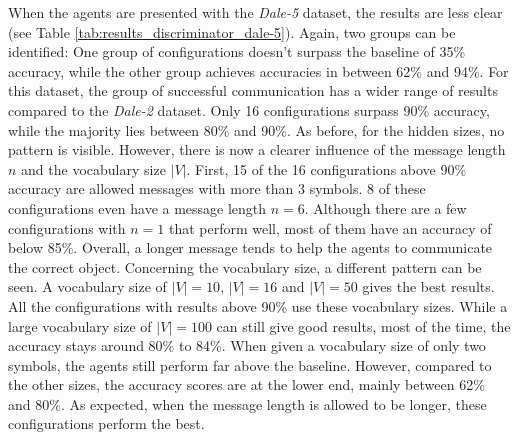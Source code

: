 When the agents are presented with the \emph{Dale-5} dataset, the results are less clear (see Table \ref{tab:results_discriminator_dale-5}).
Again, two groups can be identified: One group of configurations doesn't surpass the baseline of 35\% accuracy, while the other group achieves accuracies in between 62\% and 94\%.
For this dataset, the group of successful communication has a wider range of results compared to the \emph{Dale-2} dataset.
Only 16 configurations surpass 90\% accuracy, while the majority lies between 80\% and 90\%.
As before, for the hidden sizes, no pattern is visible.
However, there is now a clearer influence of the message length $n$ and the vocabulary size $|V|$.
First, 15 of the 16 configurations above 90\% accuracy are allowed messages with more than 3 symbols.
8 of these configurations even have a message length $n = 6$.
Although there are a few configurations with $n = 1$ that perform well, most of them have an accuracy of below 85\%.
Overall, a longer message tends to help the agents to communicate the correct object.
Concerning the vocabulary size, a different pattern can be seen.
A vocabulary size of $|V| = 10$, $|V| = 16$ and $|V| = 50$ gives the best results.
All the configurations with results above 90\% use these vocabulary sizes.
While a large vocabulary size of $|V| = 100$ can still give good results, most of the time, the accuracy stays around 80\% to 84\%.
When given a vocabulary size of only two symbols, the agents still perform far above the baseline.
However, compared to the other sizes, the accuracy scores are at the lower end, mainly between 62\% and 80\%.
As expected, when the message length is allowed to be longer, these configurations perform the best.


